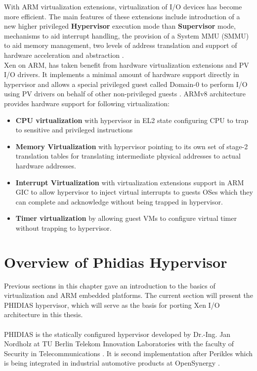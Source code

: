 With ARM virtualization extensions, virtualization of I/O devices has become more efficient. The main features of these extensions include introduction of a new higher privileged \textbf{Hypervisor} execution mode than \textbf{Supervisor} mode, mechanisms to aid interrupt handling, the provision of a System MMU (SMMU) to aid memory management, two levels of address translation and support of hardware acceleration and abstraction \cite{ARM_VE}.
\\
Xen on ARM, has taken benefit from hardware virtualization extensions and PV I/O drivers. It implements a minimal amount of hardware support directly in hypervisor and allows a special privileged guest called Domain-0 to perform I/O using PV drivers on behalf of other non-privileged guests \cite{dall_li_lim_nieh_koloventzos_2016}. ARMv8 architecture provides hardware support for following virtualization:
\begin{itemize}
	\item \textbf{CPU virtualization} with hypervisor in EL2 state configuring CPU to trap to sensitive and privileged instructions
	\item \textbf{Memory Virtualization} with hypervisor pointing to its own set of stage-2 translation tables for translating intermediate physical addresses to actual hardware addresses.
	\item \textbf{Interrupt Virtualization} with virtualization extensions support in ARM GIC to allow hypervisor to inject virtual interrupts to guests OSes which they can complete and acknowledge without being trapped in hypervisor.
	\item \textbf{Timer virtualization} by allowing guest VMs to configure virtual timer without trapping to hypervisor.
\end{itemize}

\section{Overview of Phidias Hypervisor \label{sec:summ}}
Previous sections in this chapter gave an introduction to the basics of virtualization and ARM embedded platforms. The current section will present the PHIDIAS hypervisor, which will serve as the basis for porting Xen I/O architecture in this thesis.
\\
\\
PHIDIAS is the statically configured hypervisor developed by Dr.-Ing. Jan Nordholz at TU Berlin Telekom Innovation Laboratories with the faculty of Security in Telecommunications \cite{Jan}. It is second implementation after Perikles which is being integrated in industrial automotive products at OpenSynergy \cite{opensynergy}.
